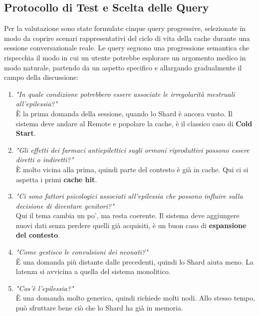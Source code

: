 \subsection{Protocollo di Test e Scelta delle Query}

Per la valutazione sono state formulate cinque query progressive, selezionate in modo da coprire scenari rappresentativi del ciclo di vita della cache durante una sessione conversazionale reale. Le query seguono una progressione semantica che rispecchia il modo in cui un utente potrebbe esplorare un argomento medico in modo naturale, partendo da un aspetto specifico e allargando gradualmente il campo della discussione:

\begin{enumerate}
    \item \textit{"In quale condizione potrebbero essere associate le irregolarità mestruali all'epilessia?"}\\
          È la prima domanda della sessione, quando lo Shard è ancora vuoto. Il sistema deve andare al Remote e popolare la cache, è il classico caso di \textbf{Cold Start}.

    \item \textit{"Gli effetti dei farmaci antiepilettici sugli ormoni riproduttivi possono essere diretti o indiretti?"}\\
          È molto vicina alla prima, quindi parte del contesto è già in cache. Qui ci si aspetta i primi \textbf{cache hit}.

    \item \textit{"Ci sono fattori psicologici associati all'epilessia che possono influire sulla decisione di diventare genitori?"}\\
          Qui il tema cambia un po', ma resta coerente. Il sistema deve aggiungere nuovi dati senza perdere quelli già acquisiti, è un buon caso di \textbf{espansione del contesto}.

    \item \textit{"Come gestisco le convulsioni dei neonati?"}\\
          È una domanda più distante dalle precedenti, quindi lo Shard aiuta meno. La latenza si avvicina a quella del sistema monolitico.

    \item \textit{"Cos'è l'epilessia?"}\\
          È una domanda molto generica, quindi richiede molti nodi. Allo stesso tempo, può sfruttare bene ciò che lo Shard ha già in memoria.
\end{enumerate}

